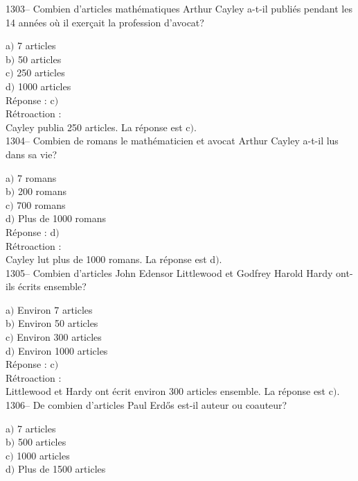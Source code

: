 ﻿\documentclass[letterpaper, 12pt]{article}
\begin{document}
1303-- Combien d'articles math\'ematiques Arthur Cayley a-t-il
publi\'es pendant les 14 ann\'ees o\`u il exer\c cait la profession
d'avocat?

a$)$ 7 articles \\
b$)$ 50 articles \\
c$)$ 250 articles\\
d$)$ 1000 articles\\

R\'eponse : c$)$\\

R\'etroaction : \\
Cayley publia 250 articles.
La r\'eponse est  c$)$.\\

1304-- Combien de romans le math\'ematicien et avocat Arthur Cayley
a-t-il lus dans sa vie?

a$)$ 7 romans \\
b$)$ 200 romans \\
c$)$ 700 romans\\
d$)$ Plus de 1000 romans\\

R\'eponse : d$)$\\

R\'etroaction : \\
Cayley lut plus de 1000 romans.
La r\'eponse est  d$)$.\\

1305-- Combien d'articles John Edensor Littlewood et Godfrey Harold
Hardy ont-ils \'ecrits ensemble?

a$)$ Environ 7 articles \\
b$)$ Environ 50 articles \\
c$)$ Environ 300 articles\\
d$)$ Environ 1000 articles\\

R\'eponse : c$)$\\

R\'etroaction : \\
Littlewood et Hardy ont \'ecrit environ 300 articles ensemble.
La r\'eponse est  c$)$.\\

1306-- De combien d'articles Paul Erd\H{o}s est-il auteur ou
coauteur?

a$)$ 7 articles \\
b$)$ 500 articles \\
c$)$ 1000 articles\\
d$)$ Plus de 1500 articles\\
\end{document}
